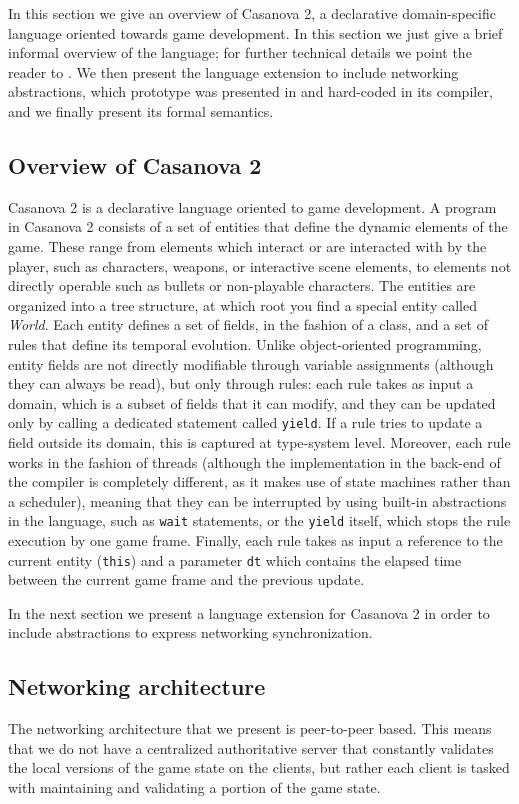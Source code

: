 In this section we give an overview of Casanova 2, a declarative domain-specific language oriented towards game development. In this section we just give a brief informal overview of the language; for further technical details we point the reader to \cite{AbbadiThesis2017, Abbadi2015}. We then present the language extension to include networking abstractions, which prototype was presented in \cite{DiGiacomo201725} and hard-coded in its compiler, and we finally present its formal semantics.

\subsection{Overview of Casanova 2}
Casanova 2 is a declarative language oriented to game development. A program in Casanova 2 consists of a set of entities that define the dynamic elements of the game. These range from elements which interact or are interacted with by the player, such as characters, weapons, or interactive scene elements, to elements not directly operable such as bullets or non-playable characters. The entities are organized into a tree structure, at which root you find a special entity called \textit{World}. Each entity defines a set of fields, in the fashion of a class, and a set of rules that define its temporal evolution. Unlike object-oriented programming, entity fields are not directly modifiable through variable assignments (although they can always be read), but only through rules: each rule takes as input a domain, which is a subset of fields that it can modify, and they can be updated only by calling a dedicated statement called \texttt{yield}. If a rule tries to update a field outside its domain, this is captured at type-system level. Moreover, each rule works in the fashion of threads (although the implementation in the back-end of the compiler is completely different, as it makes use of state machines rather than a scheduler), meaning that they can be interrupted by using built-in abstractions in the language, such as \texttt{wait} statements, or the \texttt{yield} itself, which stops the rule execution by one game frame. Finally, each rule takes as input a reference to the current entity (\texttt{this}) and a parameter \texttt{dt} which contains the elapsed time between the current game frame and the previous update.

In the next section we present a language extension for Casanova 2 in order to include abstractions to express networking synchronization.

\subsection{Networking architecture}
The networking architecture that we present is peer-to-peer based. This means that we do not have a centralized authoritative server that constantly validates the local versions of the game state on the clients, but rather each client is tasked with maintaining and validating a portion of the game state.

